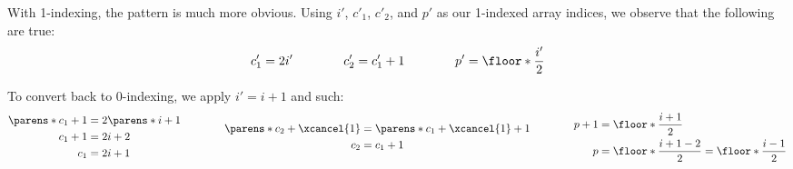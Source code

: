 With 1-indexing, the pattern is much more obvious. Using $i'$, $c'_1$, $c'_2$, and $p'$ as our 1-indexed array indices, we observe that the following are true:
\begin{gather*}
    c'_1 = 2 i'
    \qquad\qquad
    c'_2 = c'_1 + 1
    \qquad\qquad
    p' = \floor*{\frac{i'}{2}}
\end{gather*}

To convert back to 0-indexing, we apply $i' = i + 1$ and such:
\begin{gather*}
    \begin{aligned}
        \parens*{c_1 + 1} &= 2 \parens*{i + 1} \\
        c_1 + 1 &= 2 i + 2 \\
        c_1 &= 2 i + 1
    \end{aligned}
    \qquad\qquad
    \begin{aligned}
        \parens*{c_2 + \xcancel{1}} &= \parens*{c_1 + \xcancel{1}} + 1 \\
        c_2 &= c_1 + 1
    \end{aligned}
    \qquad\qquad
    \begin{aligned}
        p + 1 &= \floor*{\frac{i + 1}{2}} \\
        p &= \floor*{\frac{i + 1 - 2}{2}} = \floor*{\frac{i - 1}{2}}
    \end{aligned}
\end{gather*}



